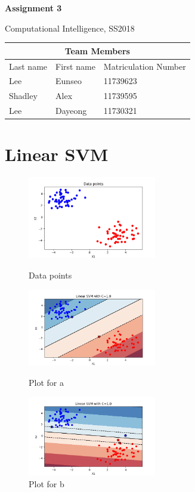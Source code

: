 \documentclass[a4paper]{article}
\begin{document}
\begin{titlepage}
  \centering
    {\huge \bf Assignment 3\par}
    \vspace{1cm}
    {\Large Computational Intelligence, SS2018\par}
    \vspace{1cm}
    \begin{tabular}{|l|l|l|}
      \hline
      \multicolumn{3}{|c|}{\textbf{Team Members}}   \\ \hline
      Last name & First name & Matriculation Number \\ \hline
      Lee       & Eunseo     & 11739623             \\ \hline
      Shadley   & Alex       & 11739595             \\ \hline
      Lee       & Dayeong    & 11730321             \\ \hline
    \end{tabular}
\end{titlepage}

\section{Linear SVM}
\begin{figure}[h]
  \begin{center}
    \includegraphics[width=0.5\textwidth]{1_datapoint.png}
    \caption{Data points}
    \includegraphics[width=0.5\textwidth]{1_a.png}
    \caption{Plot for a}
    \includegraphics[width=0.5\textwidth]{1_b.png}
    \caption{Plot for b}
  \end{center}
\end{figure}
\end{document}
